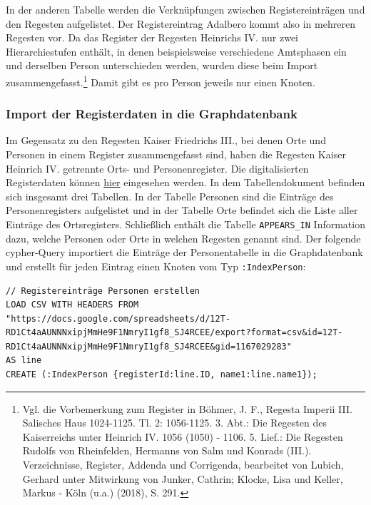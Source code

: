 \documentclass[12pt,ngerman,]{article}
\begin{document}
In der anderen Tabelle werden die Verknüpfungen zwischen
Registereinträgen und den Regesten aufgelistet. Der Registereintrag
Adalbero kommt also in mehreren Regesten vor. Da das Register der
Regesten Heinrichs IV. nur zwei Hierarchiestufen enthält, in denen
beispielsweise verschiedene Amtsphasen ein und derselben Person
unterschieden werden, wurden diese beim Import
zusammengefasst.\footnote{Vgl. die Vorbemerkung zum Register in Böhmer,
  J. F., Regesta Imperii III. Salisches Haus 1024-1125. Tl. 2:
  1056-1125. 3. Abt.: Die Regesten des Kaiserreichs unter Heinrich IV.
  1056 (1050) - 1106. 5. Lief.: Die Regesten Rudolfs von Rheinfelden,
  Hermanns von Salm und Konrads (III.). Verzeichnisse, Register, Addenda
  und Corrigenda, bearbeitet von Lubich, Gerhard unter Mitwirkung von
  Junker, Cathrin; Klocke, Lisa und Keller, Markus - Köln (u.a.) (2018),
  S. 291.} Damit gibt es pro Person jeweils nur einen Knoten.

\subsubsection{Import der Registerdaten in die
Graphdatenbank}\label{import-der-registerdaten-in-die-graphdatenbank-1}

Im Gegensatz zu den Regesten Kaiser Friedrichs III., bei denen Orte und
Personen in einem Register zusammengefasst sind, haben die Regesten
Kaiser Heinrich IV. getrennte Orts- und Personenregister. Die
digitalisierten Registerdaten können
\href{https://docs.google.com/spreadsheets/d/12T-RD1Ct4aAUNNNxipjMmHe9F1NmryI1gf8_SJ4RCEE/edit?usp=sharing}{hier}
eingesehen werden. In dem Tabellendokument befinden sich insgesamt drei
Tabellen. In der Tabelle Personen sind die Einträge des
Personenregisters aufgelistet und in der Tabelle Orte befindet sich die
Liste aller Einträge des Ortsregisters. Schließlich enthält die Tabelle
\texttt{APPEARS\_IN} Information dazu, welche Personen oder Orte in
welchen Regesten genannt sind. Der folgende cypher-Query importiert die
Einträge der Personentabelle in die Graphdatenbank und erstellt für
jeden Eintrag einen Knoten vom Typ \texttt{:IndexPerson}:

\begin{verbatim}
// Registereinträge Personen erstellen
LOAD CSV WITH HEADERS FROM "https://docs.google.com/spreadsheets/d/12T-RD1Ct4aAUNNNxipjMmHe9F1NmryI1gf8_SJ4RCEE/export?format=csv&id=12T-RD1Ct4aAUNNNxipjMmHe9F1NmryI1gf8_SJ4RCEE&gid=1167029283"
AS line
CREATE (:IndexPerson {registerId:line.ID, name1:line.name1});
\end{verbatim}
\end{document}
